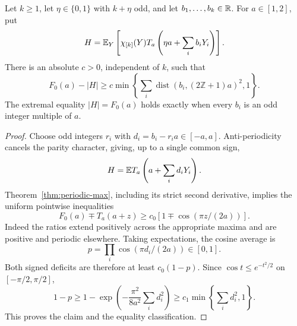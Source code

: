 \begin{theorem}
\label{thm:phase-stability}
Let $k\ge1$, let $\eta\in\{0,1\}$ with $k+\eta$ odd, and let
$b_1,\ldots,b_k\in\mathbb R$. For $a\in[1,2]$, put
\[
 H=\mathbb E_Y\left[\chi_{[k]}(Y)
 T_a\left(\eta a+\sum_i b_iY_i\right)\right].
\]
There is an absolute $c>0$, independent of $k$, such that
\begin{equation}\label{eq:phase-stability}
 F_0(a)-|H|\ge c\min\left\{
 \sum_i\operatorname{dist}(b_i,(2\mathbb Z+1)a)^2,1\right\}.
\end{equation}
The extremal equality $|H|=F_0(a)$ holds exactly when every $b_i$ is an odd integer multiple of $a$.
\end{theorem}
\begin{proof}
Choose odd integers $r_i$ with $d_i=b_i-r_i a\in[-a,a]$.
Anti-periodicity cancels the parity character, giving, up to a single
common sign,
\[
 H=\mathbb E T_a\left(a+\sum_i d_iY_i\right).
\]
Theorem~\ref{thm:periodic-max}, including its strict second derivative,
implies the uniform pointwise inequalities
\[
 F_0(a)\mp T_a(a+z)\ge c_0
       [1\mp\cos(\pi z/(2a))].
\]
Indeed the ratios extend positively across the appropriate maxima and
are positive and periodic elsewhere. Taking expectations, the cosine
average is
\[
 p=\prod_i\cos(\pi d_i/(2a))\in[0,1].
\]
Both signed deficits are therefore at least $c_0(1-p)$. Since
$\cos t\le e^{-t^2/2}$ on $[-\pi/2,\pi/2]$,
\[
 1-p\ge1-\exp\left(-\frac{\pi^2}{8a^2}\sum_i d_i^2\right)
 \ge c_1\min\left\{\sum_i d_i^2,1\right\}.
\]
This proves the claim and the equality classification.
\end{proof}

